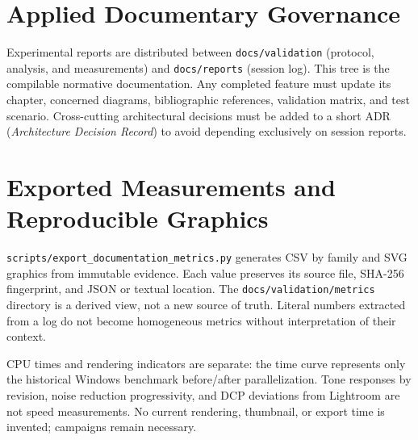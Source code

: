 \section{Applied Documentary Governance}

Experimental reports are distributed between \texttt{docs/validation} (protocol, analysis, and measurements) and \texttt{docs/reports} (session log). This tree is the compilable normative documentation. Any completed feature must update its chapter, concerned diagrams, bibliographic references, validation matrix, and test scenario. Cross-cutting architectural decisions must be added to a short ADR (\emph{Architecture Decision Record}) to avoid depending exclusively on session reports.

\section{Exported Measurements and Reproducible Graphics}

\texttt{scripts/export\_documentation\_metrics.py} generates CSV by family and SVG graphics from immutable evidence. Each value preserves its source file, SHA-256 fingerprint, and JSON or textual location. The \texttt{docs/validation/metrics} directory is a derived view, not a new source of truth. Literal numbers extracted from a log do not become homogeneous metrics without interpretation of their context.

CPU times and rendering indicators are separate: the time curve represents only the historical Windows benchmark before/after parallelization. Tone responses by revision, noise reduction progressivity, and DCP deviations from Lightroom are not speed measurements. No current rendering, thumbnail, or export time is invented; campaigns remain necessary.

